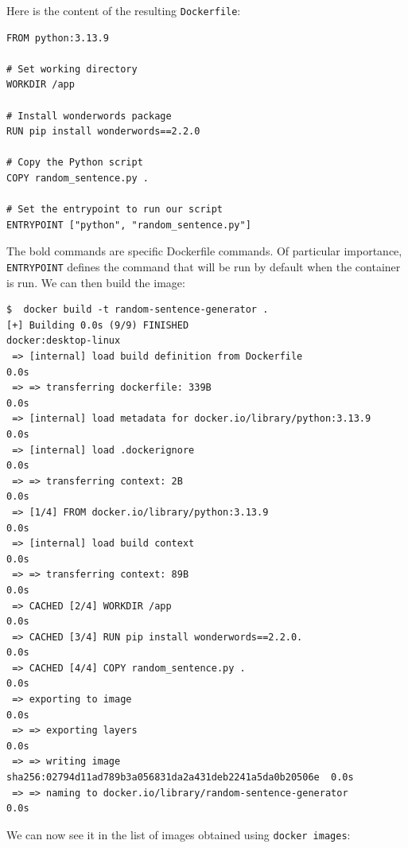 Here is the content of the resulting \texttt{Dockerfile}:

\begin{lstlisting}[style=dockerfile]
FROM python:3.13.9

# Set working directory
WORKDIR /app

# Install wonderwords package
RUN pip install wonderwords==2.2.0

# Copy the Python script
COPY random_sentence.py .

# Set the entrypoint to run our script
ENTRYPOINT ["python", "random_sentence.py"]
\end{lstlisting}

The bold commands are specific Dockerfile commands.  Of particular importance, \texttt{ENTRYPOINT} defines the command that will be run by default when the container is run. We can then build the image:

\begin{lstlisting}[style=shell]
$  docker build -t random-sentence-generator .
[+] Building 0.0s (9/9) FINISHED                              docker:desktop-linux
 => [internal] load build definition from Dockerfile                          0.0s
 => => transferring dockerfile: 339B                                          0.0s
 => [internal] load metadata for docker.io/library/python:3.13.9              0.0s
 => [internal] load .dockerignore                                             0.0s
 => => transferring context: 2B                                               0.0s
 => [1/4] FROM docker.io/library/python:3.13.9                                0.0s
 => [internal] load build context                                             0.0s
 => => transferring context: 89B                                              0.0s
 => CACHED [2/4] WORKDIR /app                                                 0.0s
 => CACHED [3/4] RUN pip install wonderwords==2.2.0.                          0.0s
 => CACHED [4/4] COPY random_sentence.py .                                    0.0s
 => exporting to image                                                        0.0s
 => => exporting layers                                                       0.0s
 => => writing image sha256:02794d11ad789b3a056831da2a431deb2241a5da0b20506e  0.0s
 => => naming to docker.io/library/random-sentence-generator                  0.0s
\end{lstlisting}

We can now see it in the list of images obtained using \texttt{docker images}:

